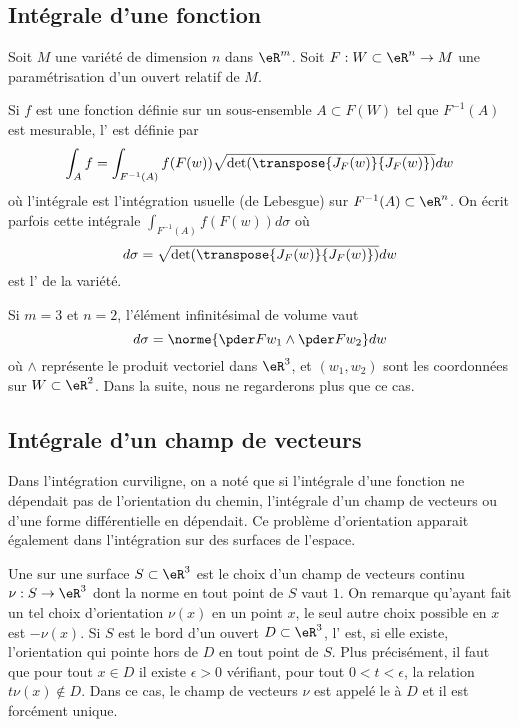 \subsection{Intégrale d'une fonction}
\label{secintsurfaciques}
Soit $M$ une variété de dimension $n$ dans $\eR^m$. Soit $F : W \subset \eR^n \to M$ une paramétrisation d'un ouvert relatif de $M$.  

Si $f$ est une fonction définie sur un sous-ensemble $A \subset F(W)$ tel que $F^{-1}(A)$ est mesurable, l' est définie par
\begin{equation*}
  \int_A f = \int_{F^{-1}(A)} f(F(w)) \sqrt{\det(\transpose{J_F(w)} {J_F(w)})} dw
\end{equation*}
où l'intégrale est l'intégration usuelle (de Lebesgue) sur $F^{-1}(A) \subset \eR^n$. On écrit parfois cette intégrale $\int_{F^{-1}(A)} f(F(w)) d\sigma$ où
\begin{equation*}
  d\sigma = \sqrt{\det(\transpose{J_F(w)} {J_F(w)})} dw
\end{equation*}
est l' de la variété. 

Si $m = 3$ et $n = 2$, l'élément infinitésimal de volume vaut
\begin{equation*}
  d \sigma = \norme{\pder F {w_1} \wedge \pder F {w_2}} dw
\end{equation*}
où $\wedge$ représente le produit vectoriel dans $\eR^3$, et $(w_1,w_2)$ sont les coordonnées sur $W \subset \eR^2$. Dans la suite, nous ne regarderons plus que ce cas.

\subsection{Intégrale d'un champ de vecteurs}
Dans l'intégration curviligne, on a noté que si l'intégrale d'une fonction ne dépendait pas de l'orientation du chemin, l'intégrale d'un champ de vecteurs ou d'une forme différentielle en dépendait. Ce problème d'orientation apparait également dans l'intégration sur des surfaces de l'espace.

Une  sur une surface $S \subset \eR^3$ est le choix
d'un champ de vecteurs continu $\nu : S \to \eR^3$ dont la norme en
tout point de $S$ vaut $1$. On remarque qu'ayant fait un tel choix
d'orientation $\nu(x)$ en un point $x$, le seul autre choix possible
en $x$ est $-\nu(x)$.
Si $S$ est le bord d'un ouvert $D \subset \eR^3$, l' est, si elle existe, l'orientation qui
pointe hors de $D$ en tout point de $S$. Plus précisément, il faut que
pour tout $x \in D$ il existe $\epsilon > 0$ vérifiant, pour tout $0 <
t < \epsilon$, la relation $t \nu(x) \notin D$. Dans ce cas, le champ
de vecteurs $\nu$ est appelé le  à $D$ et il est forcément unique.

